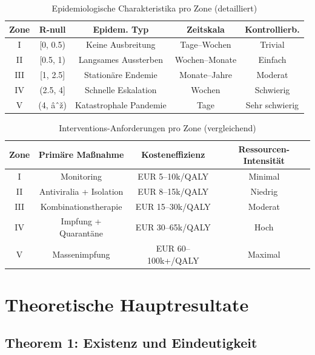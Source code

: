 ﻿\documentclass[a4paper,12pt,twoside]{article}
\theoremstyle{definition}
\begin{document}
\begin{table}[h!]
\centering
\caption{Epidemiologische Charakteristika pro Zone (detailliert)}
\label{tab:zones_detailed}
\begin{tabular}{|c|c|c|c|c|}
\hline
\textbf{Zone} & \textbf{R-null} & \textbf{Epidem. Typ} & \textbf{Zeitskala} & \textbf{Kontrollierb.} \\
\hline
I & [0, 0.5) & Keine Ausbreitung & Tage--Wochen & Trivial \\
II & [0.5, 1) & Langsames Aussterben & Wochen--Monate & Einfach \\
III & [1, 2.5] & Stationäre Endemie & Monate--Jahre & Moderat \\
IV & (2.5, 4] & Schnelle Eskalation & Wochen & Schwierig \\
V & (4, âˆž) & Katastrophale Pandemie & Tage & Sehr schwierig \\
\hline
\end{tabular}
\end{table}

\begin{table}[h!]
\centering
\caption{Interventions-Anforderungen pro Zone (vergleichend)}
\label{tab:interventions_summary}
\begin{tabular}{|c|c|c|c|}
\hline
\textbf{Zone} & \textbf{Primäre Maßnahme} & \textbf{Kosteneffizienz} & \textbf{Ressourcen-Intensität} \\
\hline
I & Monitoring & EUR 5--10k/QALY & Minimal \\
II & Antiviralia + Isolation & EUR 8--15k/QALY & Niedrig \\
III & Kombinationstherapie & EUR 15--30k/QALY & Moderat \\
IV & Impfung + Quarantäne & EUR 30--65k/QALY & Hoch \\
V & Massenimpfung & EUR 60--100k+/QALY & Maximal \\
\hline
\end{tabular}
\end{table}

\section{Theoretische Hauptresultate}
\label{sec:theorems}

\subsection{Theorem 1: Existenz und Eindeutigkeit}
\end{document}
